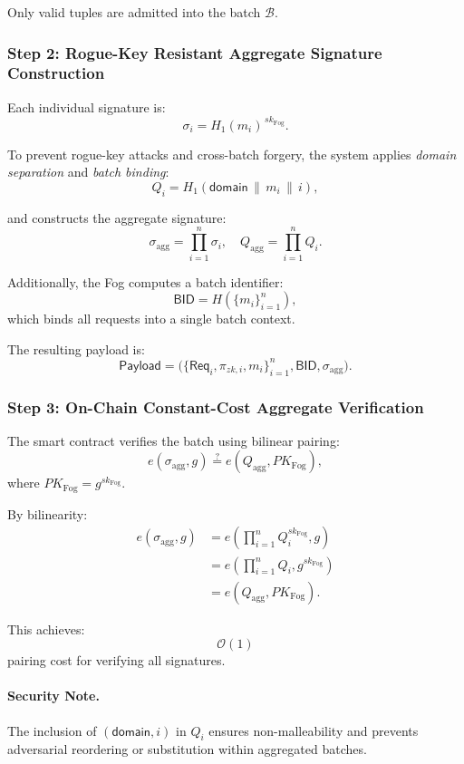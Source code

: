 \documentclass[conference]{IEEEtran}
\begin{document}
Only valid tuples are admitted into the batch $\mathcal{B}$.

\subsubsection*{Step 2: Rogue-Key Resistant Aggregate Signature Construction}

Each individual signature is:
\[
\sigma_i = H_1(m_i)^{\,sk_{\mathrm{Fog}}}.
\]

To prevent rogue-key attacks and cross-batch forgery, the system applies \emph{domain separation} and \emph{batch binding}:
\[
Q_i = H_1(\mathsf{domain} \,\|\, m_i \,\|\, i),
\]

and constructs the aggregate signature:
\[
\sigma_{\mathrm{agg}} = \prod_{i=1}^{n} \sigma_i,
\quad
Q_{\mathrm{agg}} = \prod_{i=1}^{n} Q_i.
\]

Additionally, the Fog computes a batch identifier:
\[
\mathsf{BID} = H(\{m_i\}_{i=1}^{n}),
\]
which binds all requests into a single batch context.

The resulting payload is:
\[
\mathsf{Payload} =
\bigl(\{\mathsf{Req}_i, \pi_{zk,i}, m_i\}_{i=1}^{n}, \mathsf{BID}, \sigma_{\mathrm{agg}}\bigr).
\]

\subsubsection*{Step 3: On-Chain Constant-Cost Aggregate Verification}

The smart contract verifies the batch using bilinear pairing:
\[
e(\sigma_{\mathrm{agg}}, g)
\stackrel{?}{=}
e(Q_{\mathrm{agg}}, PK_{\mathrm{Fog}}),
\]
where $PK_{\mathrm{Fog}} = g^{sk_{\mathrm{Fog}}}$.

By bilinearity:
\begin{align}
e(\sigma_{\mathrm{agg}}, g)
&= e\!\left(\prod_{i=1}^{n} Q_i^{sk_{\mathrm{Fog}}}, g\right) \\
&= e\!\left(\prod_{i=1}^{n} Q_i, g^{sk_{\mathrm{Fog}}}\right) \\
&= e(Q_{\mathrm{agg}}, PK_{\mathrm{Fog}}).
\end{align}

This achieves:
\[
\mathcal{O}(1)
\]
pairing cost for verifying all signatures.

\paragraph{Security Note.}
The inclusion of $(\mathsf{domain}, i)$ in $Q_i$ ensures non-malleability and prevents adversarial reordering or substitution within aggregated batches.
\end{document}
